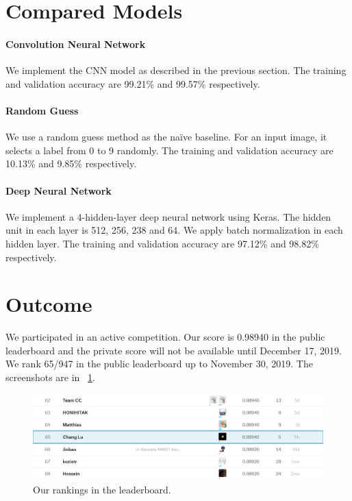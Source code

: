 \documentclass[]{article}
\begin{document}
\section{Compared Models}

\paragraph{Convolution Neural Network}
We implement the CNN model as described in the previous section. The training and validation accuracy are 99.21\% and 99.57\% respectively.

\paragraph{Random Guess}
We use a random guess method as the na\"ive baseline. For an input image, it selects a label from 0 to 9 randomly. The training and validation accuracy are 10.13\% and 9.85\% respectively.

\paragraph{Deep Neural Network}
We implement a 4-hidden-layer deep neural network using Keras. The hidden unit in each layer is 512, 256, 238 and 64. We apply batch normalization in each hidden layer. The training and validation accuracy are 97.12\% and 98.82\% respectively.

\section{Outcome}
We participated in an active competition. Our score is 0.98940 in the public leaderboard and the private score will not be available until December 17, 2019. We rank 65/947 in the public leaderboard up to November 30, 2019. The screenshots are in \figurename{~\ref{fig:rank}}.
\begin{figure}[H]
    \centering
    \includegraphics[width=14.5cm]{figs/rank}
    \caption{Our rankings in the leaderboard.}
    \label{fig:rank}
\end{figure}

\printbibliography
\end{document}
